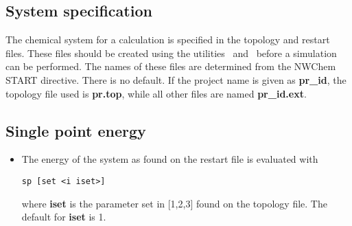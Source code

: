 \subsection{System specification}
The chemical system for a calculation is specified in the topology
and restart files. These files should be created using the utilities
\nwtop\ and \nwrst\ before a simulation can be performed.
The names of these files are determined from the NWChem START directive.
There is no default. If the project name is given as {\bf pr\_id},
the topology file used is {\bf pr.top}, while all other files
are named {\bf pr\_id.ext}.
\subsection{Single point energy}
\begin{itemize}
\item
The energy of the system as found on the restart file is evaluated with
\begin{verbatim}
sp [set <i iset>]
\end{verbatim}
where {\bf iset} is the parameter set in [1,2,3] found on the
topology file. The default for {\bf iset} is 1.
\end{itemize}
